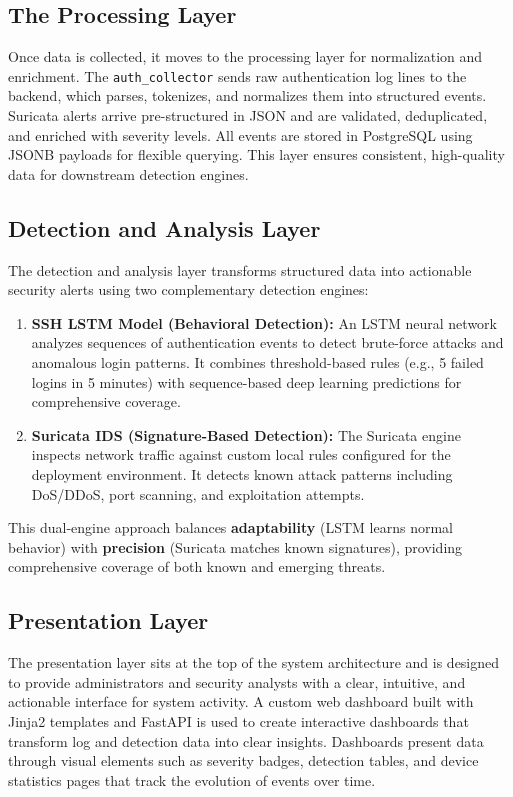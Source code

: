 \documentclass[12pt,a4paper]{report} %
\begin{document}
\subsection{The Processing Layer}
Once data is collected, it moves to the processing layer for normalization and enrichment. The \texttt{auth\_collector} sends raw authentication log lines to the backend, which parses, tokenizes, and normalizes them into structured events. Suricata alerts arrive pre-structured in JSON and are validated, deduplicated, and enriched with severity levels. All events are stored in PostgreSQL using JSONB payloads for flexible querying. This layer ensures consistent, high-quality data for downstream detection engines.

\subsection{Detection and Analysis Layer}
The detection and analysis layer transforms structured data into actionable security alerts using two complementary detection engines:

\begin{enumerate}
    \item \textbf{SSH LSTM Model (Behavioral Detection):} An LSTM neural network analyzes sequences of authentication events to detect brute-force attacks and anomalous login patterns. It combines threshold-based rules (e.g., 5 failed logins in 5 minutes) with sequence-based deep learning predictions for comprehensive coverage.
    \item \textbf{Suricata IDS (Signature-Based Detection):} The Suricata engine inspects network traffic against custom local rules configured for the deployment environment. It detects known attack patterns including DoS/DDoS, port scanning, and exploitation attempts.
\end{enumerate}

This dual-engine approach balances \textbf{adaptability} (LSTM learns normal behavior) with \textbf{precision} (Suricata matches known signatures), providing comprehensive coverage of both known and emerging threats.


\subsection{Presentation Layer}
The presentation layer sits at the top of the system architecture and is designed to provide administrators and security analysts with a clear, intuitive, and actionable interface for system activity. A custom web dashboard built with Jinja2 templates and FastAPI is used to create interactive dashboards that transform log and detection data into clear insights. Dashboards present data through visual elements such as severity badges, detection tables, and device statistics pages that track the evolution of events over time.
\end{document}
